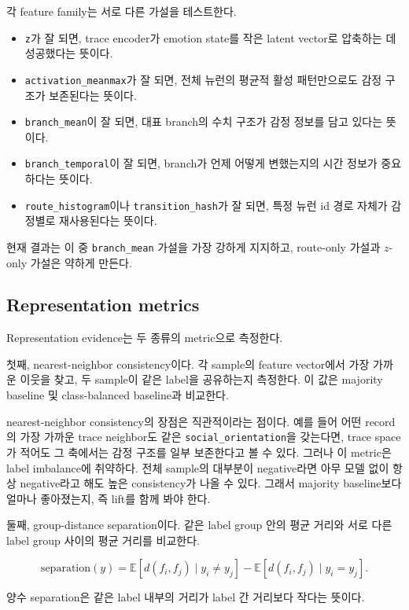 \documentclass[11pt,a4paper]{article}
\begin{document}
각 feature family는 서로 다른 가설을 테스트한다.

\begin{itemize}
  \item \texttt{z}가 잘 되면, trace encoder가 emotion state를 작은 latent vector로 압축하는 데 성공했다는 뜻이다.
  \item \texttt{activation\_meanmax}가 잘 되면, 전체 뉴런의 평균적 활성 패턴만으로도 감정 구조가 보존된다는 뜻이다.
  \item \texttt{branch\_mean}이 잘 되면, 대표 branch의 수치 구조가 감정 정보를 담고 있다는 뜻이다.
  \item \texttt{branch\_temporal}이 잘 되면, branch가 언제 어떻게 변했는지의 시간 정보가 중요하다는 뜻이다.
  \item \texttt{route\_histogram}이나 \texttt{transition\_hash}가 잘 되면, 특정 뉴런 id 경로 자체가 감정별로 재사용된다는 뜻이다.
\end{itemize}

현재 결과는 이 중 \texttt{branch\_mean} 가설을 가장 강하게 지지하고, route-only 가설과 \(z\)-only 가설은 약하게 만든다.

\subsection{Representation metrics}

Representation evidence는 두 종류의 metric으로 측정한다.

첫째, nearest-neighbor consistency이다. 각 sample의 feature vector에서 가장 가까운 이웃을 찾고, 두 sample이 같은 label을 공유하는지 측정한다. 이 값은 majority baseline 및 class-balanced baseline과 비교한다.

nearest-neighbor consistency의 장점은 직관적이라는 점이다. 예를 들어 어떤 record의 가장 가까운 trace neighbor도 같은 \texttt{social\_orientation}을 갖는다면, trace space가 적어도 그 축에서는 감정 구조를 일부 보존한다고 볼 수 있다. 그러나 이 metric은 label imbalance에 취약하다. 전체 sample의 대부분이 negative라면 아무 모델 없이 항상 negative라고 해도 높은 consistency가 나올 수 있다. 그래서 majority baseline보다 얼마나 좋아졌는지, 즉 lift를 함께 봐야 한다.

둘째, group-distance separation이다. 같은 label group 안의 평균 거리와 서로 다른 label group 사이의 평균 거리를 비교한다.

\[
\mathrm{separation}(y) =
\mathbb{E}[d(f_i,f_j) \mid y_i \neq y_j] -
\mathbb{E}[d(f_i,f_j) \mid y_i = y_j].
\]

양수 separation은 같은 label 내부의 거리가 label 간 거리보다 작다는 뜻이다.
\end{document}
